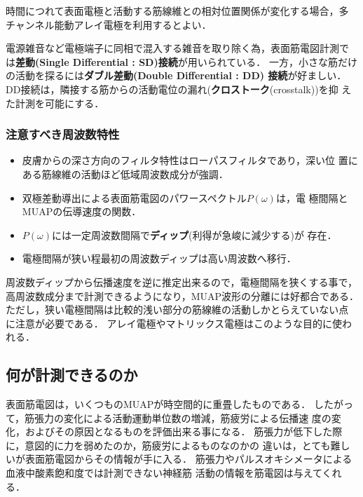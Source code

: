 \documentclass[10pt,twocolumn]{jarticle}
\begin{document}
時間につれて表面電極と活動する筋線維との相対位置関係が変化する場合，多
チャンネル能動アレイ電極を利用するとよい．

電源雑音など電極端子に同相で混入する雑音を取り除く為，表面筋電図計測で
は{\bf 差動(Single Differential : SD)接続}が用いられている．
一方，小さな筋だけの活動を探るには{\bf ダブル差動(Double Differential : DD)
接続}が好ましい．
DD接続は，隣接する筋からの活動電位の漏れ({\bf クロストーク}(crosstalk))を抑
えた計測を可能にする．

\subsubsection{注意すべき周波数特性}
\begin{itemize}
\item 皮膚からの深さ方向のフィルタ特性はローパスフィルタであり，深い位
  置にある筋線維の活動ほど低域周波数成分が強調．
\item 双極差動導出による表面筋電図のパワースペクトル$P(\omega)$は，電
  極間隔とMUAPの伝導速度の関数．
\item $P(\omega)$には一定周波数間隔で{\bf ディップ}(利得が急峻に減少する)が
  存在．
\item 電極間隔が狭い程最初の周波数ディップは高い周波数へ移行．
\end{itemize}
周波数ディップから伝播速度を逆に推定出来るので，電極間隔を狭くする事で，
高周波数成分まで計測できるようになり，MUAP波形の分離には好都合である．
ただし，狭い電極間隔は比較的浅い部分の筋線維の活動しかとらえていない点
に注意が必要である．
アレイ電極やマトリックス電極はこのような目的に使われる．


\subsection{何が計測できるのか}
表面筋電図は，いくつものMUAPが時空間的に重畳したものである．
したがって，筋張力の変化による活動運動単位数の増減，筋疲労による伝播速
度の変化，およびその原因となるものを評価出来る事になる．
筋張力が低下した際に，意図的に力を弱めたのか，筋疲労によるものなのかの
違いは，とても難しいが表面筋電図からその情報が手に入る．
筋張力やパルスオキシメータによる血液中酸素飽和度では計測できない神経筋
活動の情報を筋電図は与えてくれる．
\end{document}
